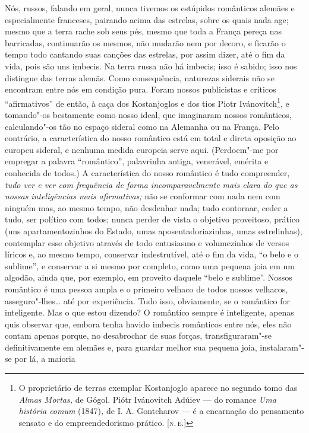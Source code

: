 Nós, russos, falando em geral, nunca tivemos os estúpidos românticos
alemães e especialmente franceses, pairando acima das estrelas, sobre os
quais nada age; mesmo que a terra rache sob seus pés, mesmo que toda a
França pereça nas barricadas, continuarão os mesmos, não mudarão nem por
decoro, e ficarão o tempo todo cantando suas canções das estrelas, por
assim dizer, até o fim da vida, pois são uns imbecis. Na terra russa não
há imbecis; isso é sabido; isso nos distingue das terras alemãs. Como
consequência, naturezas siderais não se encontram entre nós em condição
pura. Foram nossos publicistas e críticos ``afirmativos'' de então, à
caça dos Kostanjoglos e dos tios Piotr Ivánovitch\footnote{O
  proprietário de terras exemplar Kostanjoglo aparece no segundo tomo
  das \emph{Almas Mortas,} de Gógol. Piótr Ivánovitch Adúiev --- do
  romance \emph{Uma história comum} (1847)\emph{,} de I. A. Gontcharov
  --- é a encarnação do pensamento sensato e do empreendedorismo prático.
  {[}\textsc{n.\,e.}{]}}, e tomando"-os bestamente como nosso
ideal, que imaginaram nossos românticos, calculando"-os tão no espaço
sideral como na Alemanha ou na França. Pelo contrário, a característica
do nosso romântico está em total e direta oposição ao europeu sideral, e
nenhuma medida europeia serve aqui. (Perdoem"-me por empregar a palavra
``romântico'', palavrinha antiga, venerável, emérita e conhecida de
todos.) A característica do nosso romântico é tudo compreender,
\emph{tudo ver e ver com frequência de forma incomparavelmente mais
clara do que as nossas inteligências mais afirmativas;} não se conformar
com nada nem com ninguém mas, ao mesmo tempo, não desdenhar nada; tudo
contornar, ceder a tudo, ser político com todos; nunca perder de vista o
objetivo proveitoso, prático (uns apartamentozinhos do Estado, umas
aposentadoriazinhas, umas estrelinhas), contemplar esse objetivo através
de todo entusiasmo e volumezinhos de versos líricos e, ao mesmo tempo,
conservar indestrutível, até o fim da vida, ``o belo e o sublime'', e
conservar a si mesmo por completo, como uma pequena joia em um algodão,
ainda que, por exemplo, em proveito daquele ``belo e sublime''. Nossos
romântico é uma pessoa ampla e o primeiro velhaco de todos nossos
velhacos, asseguro"-lhes\ldots{} até por experiência. Tudo isso, obviamente,
se o romântico for inteligente. Mas o que estou dizendo? O romântico
sempre é inteligente, apenas quis observar que, embora tenha havido
imbecis românticos entre nós, eles não contam apenas porque, no
desabrochar de suas forças, transfiguraram"-se definitivamente em alemães
e, para guardar melhor sua pequena joia, instalaram"-se por lá, a maioria
